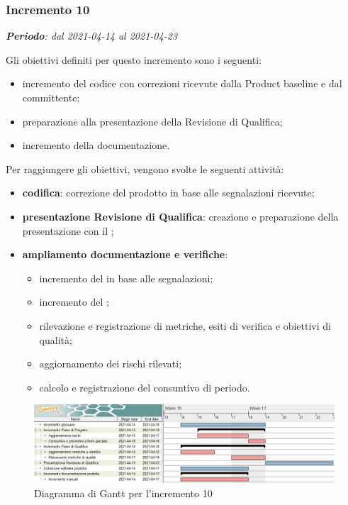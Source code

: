 \subsubsection{Incremento 10}
\textit{\textbf{Periodo}: dal 2021-04-14 al 2021-04-23}

Gli obiettivi definiti per questo incremento sono i seguenti:
\begin{itemize}
\item incremento del codice con correzioni ricevute dalla Product baseline e dal committente;
\item preparazione alla presentazione della Revisione di Qualifica;
\item incremento della documentazione.
\end{itemize}

Per raggiungere gli obiettivi, vengono svolte le seguenti attività:
\begin{itemize}
\item \textbf{codifica}: correzione del prodotto in base alle segnalazioni ricevute;
\item \textbf{presentazione Revisione di Qualifica}: creazione e preparazione della presentazione con il \VT{};
\item \textbf{ampliamento documentazione e verifiche}:
\begin{itemize}
\item incremento del \MM{} in base alle segnalazioni;
\item incremento del ;
\item rilevazione e registrazione di metriche, esiti di verifica e obiettivi di qualità;
\item aggiornamento dei rischi rilevati;
\item calcolo e registrazione del consuntivo di periodo.
\end{itemize}

\end{itemize}
\begin{figure}[H]
\centering

\centerline{\includegraphics[scale=0.6]{res/Pianificazione/Fasi/CodificaIncrementi/ganttIncremento10}}
\caption{Diagramma di Gantt per l'incremento 10}
\end{figure}
